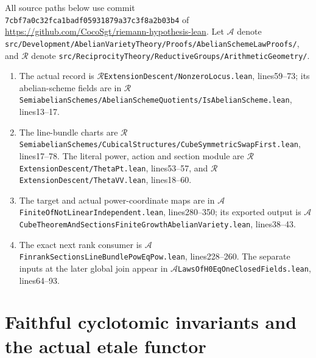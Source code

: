 \documentclass[11pt,a4paper]{article}
\numberwithin{equation}{section}
\theoremstyle{remark}\newtheorem{remark}[theorem]{Remark}
\begin{document}
All source paths below use commit
\nolinkurl{7cbf7a0c32fca1badf05931879a37c3f8a2b03b4} of
\url{https://github.com/CocoSgt/riemann-hypothesis-lean}.
Let $\mathcal A$ denote
\texttt{src/\allowbreak Development/\allowbreak Abelian\allowbreak Variety\allowbreak Theory/\allowbreak Proofs/\allowbreak Abelian\allowbreak Scheme\allowbreak Law\allowbreak Proofs/\allowbreak },
and $\mathcal R$ denote
\texttt{src/\allowbreak Reciprocity\allowbreak Theory/\allowbreak Reductive\allowbreak Groups/\allowbreak Arithmetic\allowbreak Geometry/\allowbreak }.
\begin{enumerate}
 \item The actual record is
 $\mathcal R$\texttt{Extension\allowbreak Descent/\allowbreak Nonzero\allowbreak Locus.\allowbreak lean}, lines59--73;
 its abelian-scheme fields are in
 $\mathcal R$\texttt{Semiabelian\allowbreak Schemes/\allowbreak Abelian\allowbreak Scheme\allowbreak Quotients/\allowbreak Is\allowbreak Abelian\allowbreak Scheme.\allowbreak lean},
 lines13--17.
 \item The line-bundle charts are
 $\mathcal R$\texttt{Semiabelian\allowbreak Schemes/\allowbreak Cubical\allowbreak Structures/\allowbreak Cube\allowbreak Symmetric\allowbreak Swap\allowbreak First.\allowbreak lean},
 lines17--78.  The literal power, action and section module are
 $\mathcal R$\texttt{Extension\allowbreak Descent/\allowbreak Theta\allowbreak Pt.\allowbreak lean}, lines53--57, and
 $\mathcal R$\texttt{Extension\allowbreak Descent/\allowbreak Theta\allowbreak VV.\allowbreak lean}, lines18--60.
 \item The target and actual power-coordinate maps are in
 $\mathcal A$\texttt{Finite\allowbreak Of\allowbreak Not\allowbreak Linear\allowbreak Independent.\allowbreak lean}, lines280--350;
 its exported output is
 $\mathcal A$\texttt{Cube\allowbreak Theorem\allowbreak And\allowbreak Sections\allowbreak Finite\allowbreak Growth\allowbreak Abelian\allowbreak Variety.\allowbreak lean},
 lines38--43.
 \item The exact next rank consumer is
 $\mathcal A$\texttt{Finrank\allowbreak Sections\allowbreak Line\allowbreak Bundle\allowbreak Pow\allowbreak Eq\allowbreak Pow.\allowbreak lean}, lines228--260.
 The separate inputs at the later global join appear in
 $\mathcal A$\texttt{Laws\allowbreak Of\allowbreak H0Eq\allowbreak One\allowbreak Closed\allowbreak Fields.\allowbreak lean}, lines64--93.
\end{enumerate}


\section{Faithful cyclotomic invariants and the actual etale functor}
\label{sec:faithful-etale-v057}
\end{document}
